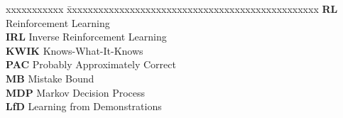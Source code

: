 \abbreviations
 
\noindent 
\begin{tabbing}
xxxxxxxxxxx \= xxxxxxxxxxxxxxxxxxxxxxxxxxxxxxxxxxxxxxxxxxxxxxxx \kill
\textbf{RL}   \> Reinforcement Learning \\
\textbf{IRL}   \> Inverse Reinforcement Learning \\

\textbf{KWIK}   \> Knows-What-It-Knows \\
\textbf{PAC} \> Probably Approximately Correct\\
\textbf{MB} \> Mistake Bound \\
\textbf{MDP} \> Markov Decision Process \\
\textbf{LfD} \> Learning from Demonstrations \\

\end{tabbing}

\pagebreak
